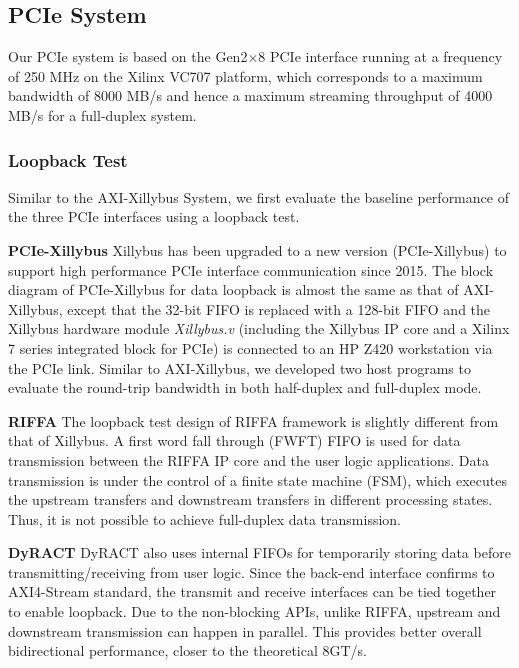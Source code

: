 \subsection{PCIe System}
Our PCIe system is based on the Gen2$\times$8 PCIe interface running at a frequency of 250 MHz on the Xilinx VC707 platform, which corresponds to a maximum bandwidth of 8000 MB/s and hence a maximum streaming throughput of 4000 MB/s for a full-duplex system. 


\subsubsection{Loopback Test}
Similar to the AXI-Xillybus System, we first evaluate the baseline performance of the three PCIe interfaces using a loopback test. 

\noindent \textbf{PCIe-Xillybus}
Xillybus has been upgraded to a new version (PCIe-Xillybus) to support high performance PCIe interface communication since 2015. 
The block diagram of PCIe-Xillybus for data loopback is almost the same as that of AXI-Xillybus, except that the 32-bit FIFO is replaced with a 128-bit FIFO and the Xillybus hardware module \textit{Xillybus.v} (including the Xillybus IP core and a Xilinx 7 series integrated block for PCIe) is connected to an HP Z420 workstation via the PCIe link. 
Similar to AXI-Xillybus, we developed two host programs to evaluate the round-trip bandwidth in both half-duplex and full-duplex mode. 

\noindent \textbf{RIFFA}
The loopback test design of RIFFA framework is slightly different from that of Xillybus. 
A first word fall through (FWFT) FIFO is used for data transmission between the RIFFA IP core and the user logic applications. 
Data transmission is under the control of a finite state machine (FSM), which executes the upstream transfers and downstream transfers in different processing states.  
Thus, it is not possible to achieve full-duplex data transmission. 

\noindent \textbf{DyRACT}
DyRACT also uses internal FIFOs for temporarily storing data before transmitting/receiving from user logic.
Since the back-end interface confirms to AXI4-Stream standard, the transmit and receive interfaces can be tied together to enable loopback.
Due to the non-blocking APIs, unlike RIFFA, upstream and downstream transmission can happen in parallel.
This provides better overall bidirectional performance, closer to the theoretical 8GT/s.

